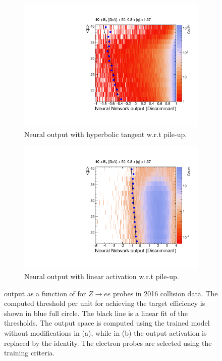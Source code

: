\begin{figure}[h!tb]
  \begin{center}
  \begin{subfigure}[c]{.48\textwidth}
  \centering
  \includegraphics[width=\textwidth]{sections/03_ringer/figures/th2_signal_tight_cutbased_et3_eta1_with_tansig.pdf}
  \caption{Neural output with hyperbolic tangent w.r.t pile-up.}
  \label{fig:nn_correction_with_tansig}
  \end{subfigure}
  \hfill
  \begin{subfigure}[c]{.48\textwidth}
  \centering
  \includegraphics[width=\textwidth]{sections/03_ringer/figures/th2_signal_tight_cutbased_et3_eta1_without_tansig.pdf}
  \caption{Neural output with linear activation w.r.t pile-up.}
  \label{fig:nn_correction_without_tansig}
  \end{subfigure}
  \caption{
    \rnn output as a function of \avgmu{} for $Z\rightarrow ee$ probes in 
    2016 collision data.
    The computed threshold per \avgmu{} unit for achieving the target 
    efficiency is shown in blue full circle. The black line is a linear fit of the thresholds.
    The output space is computed using the trained model without modifications 
    in (a), while in (b) the output activation is replaced by the identity.
    The electron probes are selected using the training criteria.
  }%
  \end{center}
  \end{figure}
